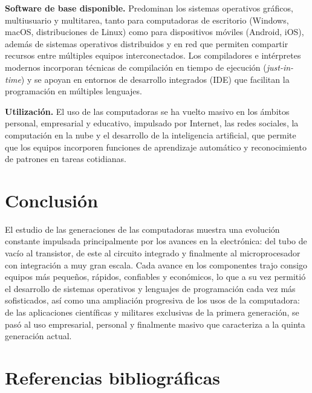 \documentclass[12pt,letterpaper]{article}
\begin{document}
\textbf{Software de base disponible.} Predominan los sistemas operativos gráficos, multiusuario y multitarea, tanto para computadoras de escritorio (Windows, macOS, distribuciones de Linux) como para dispositivos móviles (Android, iOS), además de sistemas operativos distribuidos y en red que permiten compartir recursos entre múltiples equipos interconectados. Los compiladores e intérpretes modernos incorporan técnicas de compilación en tiempo de ejecución (\textit{just-in-time}) y se apoyan en entornos de desarrollo integrados (IDE) que facilitan la programación en múltiples lenguajes.

\textbf{Utilización.} El uso de las computadoras se ha vuelto masivo en los ámbitos personal, empresarial y educativo, impulsado por Internet, las redes sociales, la computación en la nube y el desarrollo de la inteligencia artificial, que permite que los equipos incorporen funciones de aprendizaje automático y reconocimiento de patrones en tareas cotidianas.

\section{Conclusión}

El estudio de las generaciones de las computadoras muestra una evolución constante impulsada principalmente por los avances en la electrónica: del tubo de vacío al transistor, de este al circuito integrado y finalmente al microprocesador con integración a muy gran escala. Cada avance en los componentes trajo consigo equipos más pequeños, rápidos, confiables y económicos, lo que a su vez permitió el desarrollo de sistemas operativos y lenguajes de programación cada vez más sofisticados, así como una ampliación progresiva de los usos de la computadora: de las aplicaciones científicas y militares exclusivas de la primera generación, se pasó al uso empresarial, personal y finalmente masivo que caracteriza a la quinta generación actual.

\newpage
\section*{Referencias bibliográficas}
\end{document}
